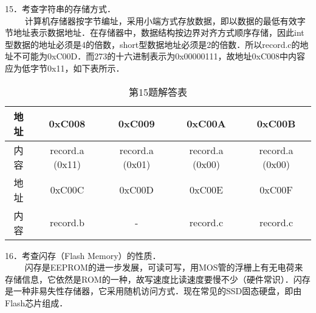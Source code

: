 15．考查字符串的存储方式．\\
$\qquad$ 计算机存储器按字节编址，采用小端方式存放数据，即以数据的最低有效字节地址表示数据地址．在存储器中，数据结构按边界对齐方式顺序存储，因此int型数据的地址必须是4的倍数，short型数据地址必须是2的倍数．所以record.c的地址不可能为0xC00D．而273的十六进制表示为0x00000111，故地址0xC008中内容应为低字节0x11，如下表所示．
\begin{table}[ht]
\centering
\caption{第15题解答表}\label{CSN12_tab6}
\begin{tabular}{|c|c|c|c|c|}
\hline
地址 & 0xC008 & 0xC009 & 0xC00A & 0xC00B \\
\hline
内容 & record.a (0x11) & record.a (0x01) & record.a (0x00) & record.a (0x00) \\
\hline
地址 & 0xC00C & 0xC00D & 0xC00E & 0xC00F \\
\hline
内容 & record.b & - & record.c & record.c \\
\hline
\end{tabular}
\end{table}

16．考查闪存（Flash Memory）的性质．\\
$\qquad$ 闪存是EEPROM的进一步发展，可读可写，用MOS管的浮栅上有无电荷来存储信息，它依然是ROM的一种，故写速度比读速度要慢不少（硬件常识）．闪存是一种非易失性存储器，它采用随机访问方式．现在常见的SSD固态硬盘，即由Flash芯片组成．